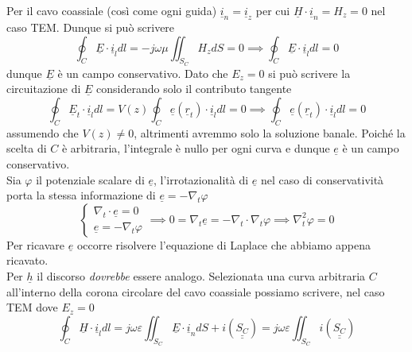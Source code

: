 \documentclass{book}
\begin{document}
        Per il cavo coassiale (così come ogni guida) $\underline{i}_{n}=\underline{i}_{z}$ per cui $\underline{H}\cdot \underline{i}_{n} = H_{z} = 0$ nel caso TEM.
        Dunque si può scrivere 
        \begin{equation}
            \oint_{C} \underline{E} \cdot \underline{i}_{l} dl = -j \omega \mu \iint_{S_{C}} H_{z} dS = 0 \implies \oint_{C} \underline{E} \cdot \underline{i}_{l} dl = 0 
        \end{equation} 
        dunque $\underline{E}$ è un campo conservativo. Dato che $E_{z}= 0$ si può scrivere la circuitazione di $\underline{E}$ considerando solo il contributo tangente
        \begin{equation}
            \oint_{C} \underline{E}_{t} \cdot \underline{i}_{l} dl = V(z) \oint_{C} \underline{e} (\underline{r}_{t}) \cdot \underline{i}_{l} dl = 0 \implies \oint_{C} \underline{e} (\underline{r}_{t}) \cdot \underline{i}_{l} dl = 0
        \end{equation}
        assumendo che $V(z) \neq 0$, altrimenti avremmo solo la soluzione banale. Poiché la scelta di $C$ è arbitraria, l'integrale è nullo per ogni curva e dunque $\underline{e}$ è un campo conservativo. \\
        Sia $\varphi$ il potenziale scalare di $\underline{e}$, l'irrotazionalità di $\underline{e}$ nel caso di conservatività porta la stessa informazione di $\underline{e} = - \nabla_{t} \varphi$
        \begin{equation}
            \begin{cases}
                \nabla_{t} \cdot \underline{e} = 0 \\
                \underline{e} = - \nabla_{t} \varphi
                \end{cases} \implies 
                0 = \nabla_{t} \underline{e} = - \nabla_{t} \cdot \nabla_{t} \varphi \implies \nabla_{t} ^{2} \varphi = 0 
        \end{equation}
        Per ricavare $\underline{e}$ occorre risolvere l'equazione di Laplace che abbiamo appena ricavato. \\
        Per $\underline{h}$ il discorso \textit{dovrebbe} essere analogo. Selezionata una curva arbitraria $C$ all'interno della corona circolare del cavo coassiale possiamo scrivere, nel caso TEM dove $E_{z} = 0$
        \begin{equation}
            \oint_{C} \underline{H} \cdot \underline{i}_{l} dl = j \omega \varepsilon \iint_{S_{C}} \underline{E} \cdot \underline{i}_{n} dS + i (\underline{\underline{S_{C}}}) =
            j \omega \varepsilon \iint_{S_{C}} i (\underline{\underline{S_{C}}})
        \end{equation}
\end{document}
